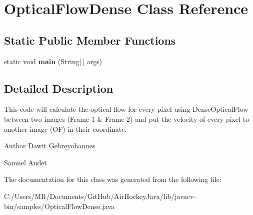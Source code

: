 \hypertarget{class_optical_flow_dense}{}\section{Optical\+Flow\+Dense Class Reference}
\label{class_optical_flow_dense}
\subsection*{Static Public Member Functions}
\begin{DoxyCompactItemize}
\item 
\hypertarget{class_optical_flow_dense_a28d99e13c711a14a70c6fc81392b8f66}{}static void {\bfseries main} (String\mbox{[}$\,$\mbox{]} args)\label{class_optical_flow_dense_a28d99e13c711a14a70c6fc81392b8f66}

\end{DoxyCompactItemize}


\subsection{Detailed Description}
This code will calculate the optical flow for every pixel using Dense\+Optical\+Flow between two images (Frame-\/1 \& Frame-\/2) and put the velocity of every pixel to another image (O\+F) in their coordinate.

\begin{DoxyAuthor}{Author}
Dawit Gebreyohannes 

Samuel Audet 
\end{DoxyAuthor}


The documentation for this class was generated from the following file\+:\begin{DoxyCompactItemize}
\item 
C\+:/\+Users/\+M\+R/\+Documents/\+Git\+Hub/\+Air\+Hockey\+Java/lib/javacv-\/bin/samples/Optical\+Flow\+Dense.\+java\end{DoxyCompactItemize}

